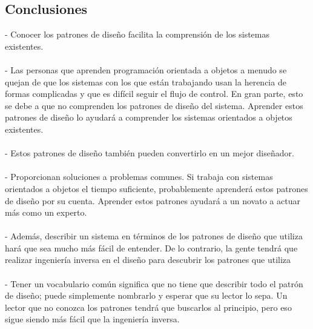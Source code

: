 \documentclass[twoside,twocolumn]{article}
\begin{document}
\begin{itemize}
\section{Conclusiones}
{- Conocer los patrones de diseño facilita la comprensión de los sistemas existentes.}
\\
\\{- Las personas que aprenden programación orientada a objetos a menudo se quejan de que los sistemas con los que están trabajando usan la herencia de formas complicadas y que es difícil seguir el flujo de control. En gran parte, esto se debe a que no comprenden los patrones de diseño del sistema. Aprender estos patrones de diseño lo ayudará a comprender los sistemas orientados a objetos existentes.}
\\
\\{- Estos patrones de diseño también pueden convertirlo en un mejor diseñador. }
\\
\\{- Proporcionan soluciones a problemas comunes. Si trabaja con sistemas orientados a objetos el tiempo suficiente, probablemente aprenderá estos patrones de diseño por su cuenta. Aprender estos patrones ayudará a un novato a actuar más como un experto.}
\\
\\{- Además, describir un sistema en términos de los patrones de diseño que utiliza hará que sea mucho más fácil de entender. De lo contrario, la gente tendrá que realizar ingeniería inversa en el diseño para descubrir los patrones que utiliza}
\\
\\{- Tener un vocabulario común significa que no tiene que describir todo el patrón de diseño; puede simplemente nombrarlo y esperar que su lector lo sepa. Un lector que no conozca los patrones tendrá que buscarlos al principio, pero eso sigue siendo más fácil que la ingeniería inversa.}

\end{itemize}
\end{document}
